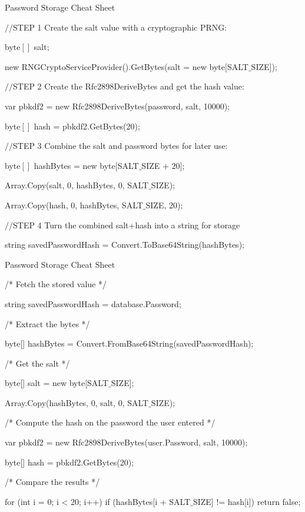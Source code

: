 \documentclass[pdf]{beamer}
\begin{document}
\begin{frame}{Password Storage Cheat Sheet}

$//$STEP 1 Create the salt value with a cryptographic PRNG:

byte$[]$ salt;

new RNGCryptoServiceProvider().GetBytes(salt = new byte$[$SALT$\_$SIZE$]$);
\newline

$//$STEP 2 Create the Rfc2898DeriveBytes and get the hash value:

var pbkdf2 = new Rfc2898DeriveBytes(password, salt, 10000);

byte$[]$ hash = pbkdf2.GetBytes(20);
\newline

$//$STEP 3 Combine the salt and password bytes for later use:

byte$[]$ hashBytes = new byte$[$SALT$\_$SIZE + 20$]$;

Array.Copy(salt, 0, hashBytes, 0, SALT$\_$SIZE);

Array.Copy(hash, 0, hashBytes, SALT$\_$SIZE, 20);
\newline

$//$STEP 4 Turn the combined salt+hash into a string for storage

string savedPasswordHash = Convert.ToBase64String(hashBytes);

\end{frame}



\begin{frame}{Password Storage Cheat Sheet}

/* Fetch the stored value */

string savedPasswordHash = database.Password;
\newline

/* Extract the bytes */
                        
byte[] hashBytes = Convert.FromBase64String(savedPasswordHash);
\newline

/* Get the salt */
                        
byte[] salt = new byte[SALT$\_$SIZE];

Array.Copy(hashBytes, 0, salt, 0, SALT$\_$SIZE);
\newline

/* Compute the hash on the password the user entered */

var pbkdf2 = new Rfc2898DeriveBytes(user.Password, salt, 10000);

byte[] hash = pbkdf2.GetBytes(20);
\newline

/* Compare the results */

for (int i = 0; i < 20; i++) { if (hashBytes[i + SALT$\_$SIZE] != hash[i]) { return false; } }
                        
\end{frame}
\end{document}
